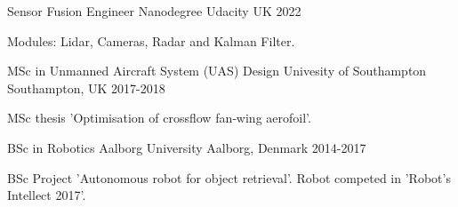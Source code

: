 

\begin{cventries}

  \cventry
    {Sensor Fusion Engineer Nanodegree} %
    {Udacity} %
    {UK} %
    {2022} %
    {
      \begin{cvitems} %
        \item {Modules: Lidar, Cameras, Radar and Kalman Filter.}
      \end{cvitems}
    }
    \newline
    \newline
  \cventry
    {MSc in Unmanned Aircraft System (UAS) Design} %
    {Univesity of Southampton} %
    {Southampton, UK} %
    {2017-2018} %
    {
      \begin{cvitems} %
        \item {MSc thesis ’Optimisation of crossflow fan‑wing aerofoil’.}
      \end{cvitems}
    }
    \newline
    \newline
  \cventry
    {BSc in Robotics} %
    {Aalborg University} %
    {Aalborg, Denmark} %
    {2014-2017} %
    {
      \begin{cvitems} %
        \item {BSc Project ’Autonomous robot for object retrieval’. Robot competed in ’Robot’s Intellect 2017’.}
      \end{cvitems}
    }
\end{cventries}
